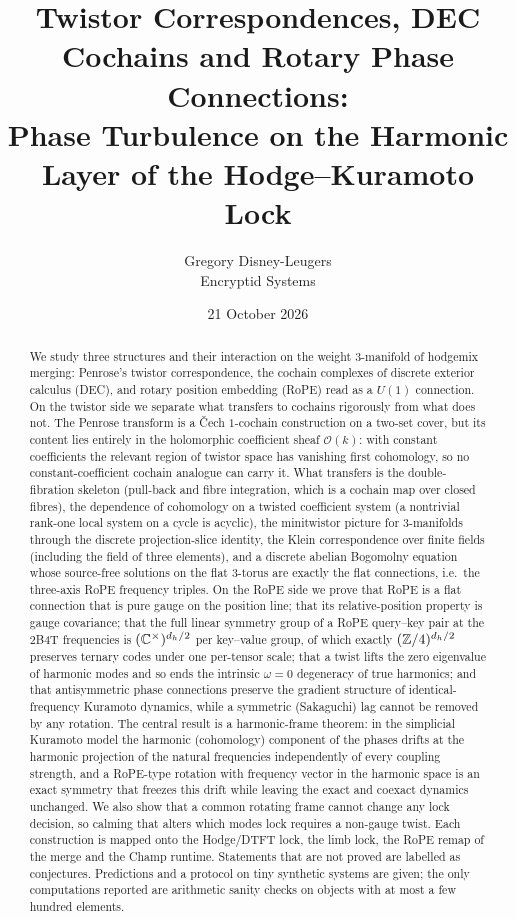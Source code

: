 \documentclass[10pt]{article}
\title{Twistor Correspondences, DEC Cochains and Rotary Phase Connections:\\ Phase Turbulence on the Harmonic Layer of the Hodge--Kuramoto Lock}
\author{Gregory Disney-Leugers\\ Encryptid Systems}
\date{21 October 2026}
\theoremstyle{definition}
\newcommand{\cO}{\mathcal O}\newcommand{\cH}{\mathcal H}
\begin{document}
\maketitle

\begin{abstract}
We study three structures and their interaction on the weight 3-manifold of hodgemix merging: Penrose's twistor correspondence, the cochain complexes of discrete exterior calculus (DEC), and rotary position embedding (RoPE) read as a $U(1)$ connection. On the twistor side we separate what transfers to cochains rigorously from what does not. The Penrose transform is a \v{C}ech $1$-cochain construction on a two-set cover, but its content lies entirely in the holomorphic coefficient sheaf $\cO(k)$: with constant coefficients the relevant region of twistor space has vanishing first cohomology, so no constant-coefficient cochain analogue can carry it. What transfers is the double-fibration skeleton (pull-back and fibre integration, which is a cochain map over closed fibres), the dependence of cohomology on a twisted coefficient system (a nontrivial rank-one local system on a cycle is acyclic), the minitwistor picture for 3-manifolds through the discrete projection-slice identity, the Klein correspondence over finite fields (including the field of three elements), and a discrete abelian Bogomolny equation whose source-free solutions on the flat 3-torus are exactly the flat connections, i.e.\ the three-axis RoPE frequency triples. On the RoPE side we prove that RoPE is a flat connection that is pure gauge on the position line; that its relative-position property is gauge covariance; that the full linear symmetry group of a RoPE query--key pair at the 2B4T frequencies is $(\mathbb C^\times)^{d_h/2}$ per key--value group, of which exactly $(\mathbb Z/4)^{d_h/2}$ preserves ternary codes under one per-tensor scale; that a twist lifts the zero eigenvalue of harmonic modes and so ends the intrinsic $\omega=0$ degeneracy of true harmonics; and that antisymmetric phase connections preserve the gradient structure of identical-frequency Kuramoto dynamics, while a symmetric (Sakaguchi) lag cannot be removed by any rotation. The central result is a harmonic-frame theorem: in the simplicial Kuramoto model the harmonic (cohomology) component of the phases drifts at the harmonic projection of the natural frequencies independently of every coupling strength, and a RoPE-type rotation with frequency vector in the harmonic space is an exact symmetry that freezes this drift while leaving the exact and coexact dynamics unchanged. We also show that a common rotating frame cannot change any lock decision, so calming that alters which modes lock requires a non-gauge twist. Each construction is mapped onto the Hodge/DTFT lock, the limb lock, the RoPE remap of the merge and the Champ runtime. Statements that are not proved are labelled as conjectures. Predictions and a protocol on tiny synthetic systems are given; the only computations reported are arithmetic sanity checks on objects with at most a few hundred elements.
\end{abstract}
\end{document}
